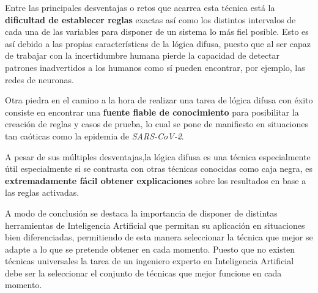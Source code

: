 \documentclass[12pt,a4paper, xcolor=table]{article}
\begin{document}
  Entre las principales desventajas o retos que acarrea esta técnica está la \textbf{dificultad de establecer reglas} exactas así como los distintos intervalos de cada una de las variables para disponer de un sistema lo más fiel posible. Esto es así debido a las propias características de la lógica difusa, puesto que al ser capaz de trabajar con la incertidumbre humana pierde la capacidad de detectar patrones inadvertidos a los humanos como sí pueden encontrar, por ejemplo, las redes de neuronas.
      
  \vspace{2mm}
  
  
  Otra piedra en el camino a la hora de realizar una tarea de lógica difusa con éxito consiste en encontrar una \textbf{fuente fiable de conocimiento} para posibilitar la creación de reglas y casos de prueba, lo cual se pone de manifiesto en situaciones tan caóticas como la epidemia de \textit{SARS-CoV-2}. 
  
  \vspace{2mm}
  
  A pesar de sus múltiples desventajas,la lógica difusa es una técnica especialmente útil especialmente si se contrasta con otras técnicas conocidas como caja negra, es \textbf{extremadamente fácil obtener explicaciones} sobre los resultados en base a las reglas activadas.
  
  \vspace{2mm}
  
  A modo de conclusión se destaca la importancia de disponer de distintas herramientas de Inteligencia Artificial que permitan su aplicación en situaciones bien diferenciadas, permitiendo de esta manera seleccionar la técnica que mejor se adapte a lo que se pretende obtener en cada momento. Puesto que no existen técnicas universales la tarea de un ingeniero experto en Inteligencia Artificial debe ser la seleccionar el conjunto de técnicas que mejor funcione en cada momento.
  
\clearpage 



\end{document}
